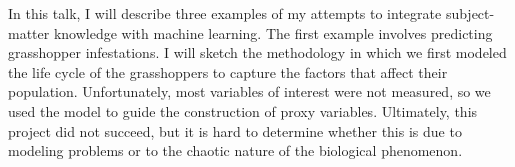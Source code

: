 \license

In this talk, I will describe three examples of my attempts to integrate subject-matter knowledge with machine learning. The first example involves predicting grasshopper infestations. I will sketch the methodology in which we first modeled the life cycle of the grasshoppers to capture the factors that affect their population. Unfortunately, most variables of interest were not measured, so we used the model to guide the construction of proxy variables. Ultimately, this project did not succeed, but it is hard to determine whether this is due to modeling problems or to the chaotic nature of the biological phenomenon.
